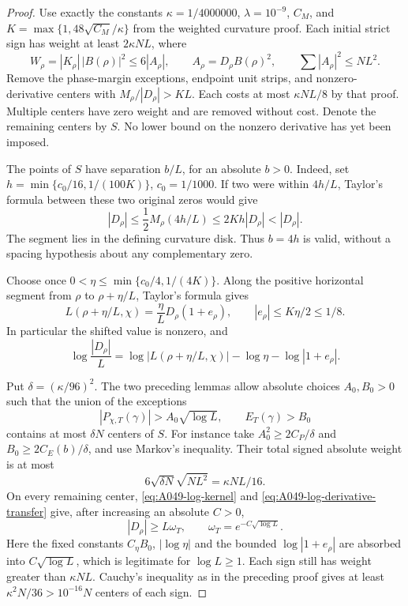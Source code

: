 \begin{proof}
Use exactly the constants \(\kappa=1/4000000\),
\(\lambda=10^{-9}\), \(C_M\), and
\(K=\max\{1,48\sqrt{C_M}/\kappa\}\) from the weighted
curvature proof. Each initial strict sign has weight at
least \(2\kappa NL\), where
\[
 W_\rho=|K_\rho|\,|B(\rho)|^2\le6|A_\rho|,
 \qquad A_\rho=D_\rho B(\rho)^2,
 \qquad\sum|A_\rho|^2\le NL^2.
\]
Remove the phase-margin exceptions, endpoint unit strips,
and nonzero-derivative centers with
\(M_\rho/|D_\rho|>KL\). Each costs at most \(\kappa NL/8\)
by that proof. Multiple centers have zero weight and are
removed without cost. Denote the remaining centers by \(S\).
No lower bound on the nonzero derivative has yet been imposed.

The points of \(S\) have separation \(b/L\), for an absolute
\(b>0\). Indeed, set \(h=\min\{c_0/16,1/(100K)\}\),
\(c_0=1/1000\). If two were within \(4h/L\), Taylor's
formula between these two original zeros would give
\[
             |D_\rho|\le\frac12M_\rho(4h/L)
                            \le2Kh|D_\rho|<|D_\rho|.
\]
The segment lies in the defining curvature disk. Thus
\(b=4h\) is valid, without a spacing hypothesis about
any complementary zero.

Choose once
\(0<\eta\le\min\{c_0/4,1/(4K)\}\). Along the positive
horizontal segment from \(\rho\) to \(\rho+\eta/L\),
Taylor's formula gives
\[
 L(\rho+\eta/L,\chi)=\frac\eta L D_\rho(1+e_\rho),
                   \qquad |e_\rho|\le K\eta/2\le1/8.
\]
In particular the shifted value is nonzero, and
\begin{equation}\label{eq:A049-log-derivative-transfer}
 \log\frac{|D_\rho|}L
     =\log|L(\rho+\eta/L,\chi)|-\log\eta
                                         -\log|1+e_\rho|.
\end{equation}

Put \(\delta=(\kappa/96)^2\). The two preceding lemmas
allow absolute choices \(A_0,B_0>0\) such that the union
of the exceptions
\[
 |P_{\chi,T}(\gamma)|>A_0\sqrt{\log L},\qquad
                         E_T(\gamma)>B_0
\]
contains at most \(\delta N\) centers of \(S\).
For instance take \(A_0^2\ge2C_P/\delta\) and
\(B_0\ge2C_E(b)/\delta\), and use Markov's inequality.
Their total signed absolute weight is at most
\[
                  6\sqrt{\delta N}\sqrt{NL^2}
                                      =\kappa NL/16.
\]
On every remaining center, \eqref{eq:A049-log-kernel} and
\eqref{eq:A049-log-derivative-transfer} give, after increasing
an absolute \(C>0\),
\begin{equation}\label{eq:A049-sublog-derivative}
                   |D_\rho|\ge L\omega_T,
            \qquad \omega_T=e^{-C\sqrt{\log L}}.
\end{equation}
Here the fixed constants \(C_\eta B_0\), \(|\log\eta|\)
and the bounded \(\log|1+e_\rho|\) are absorbed into
\(C\sqrt{\log L}\), which is legitimate for \(\log L\ge1\).
Each sign still has weight greater than \(\kappa NL\).
Cauchy's inequality as in the preceding proof gives at
least \(\kappa^2N/36>10^{-16}N\) centers of each sign.


\end{proof}
